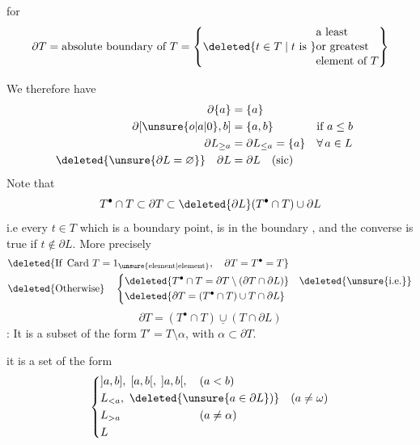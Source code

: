 for
\[
\partial T=\text{absolute boundary of }T
=\left\{\deleted{t\in T\mid t\text{ is }}\begin{aligned}
&\text{a least}\\[-2pt]
&\text{or greatest}\\[-2pt]
&\text{element of }T
\end{aligned}\right\}
\]

We therefore have
\[
\begin{aligned}
\partial\{a\}&=\{a\}\\
\partial[\unsure{o|a|0},b]&=\{a,b\} &&\text{if }a\leq b\\
\partial L_{\geq a}&=\partial L_{\leq a}=\{a\} &&\forall\,a\in L\\
\deleted{\unsure{\partial L=\varnothing}}\quad\partial L&=\partial L\quad\text{(sic)}
\end{aligned}
\]
Note that
\[
T^\bullet\cap T\subset\partial T\subset\deleted{\partial L}(T^\bullet\cap T)\cup\partial L
\]
i.e every $t\in T$ which is a boundary point, is in the boundary , and the converse is true if $t\notin\partial L$. More precisely
\[
\begin{aligned}
&\deleted{\text{If }\operatorname{Card}\,T=1_{\unsure{\mathrm{element}|\mathrm{element}}},\quad\partial T=T^\bullet=T}\\
&\deleted{\text{Otherwise}}\quad
\left\{\begin{aligned}
&\deleted{T^\bullet\cap T=\partial T\setminus(\partial T\cap\partial L)}\quad\deleted{\text{\unsure{i.e.}}}\\
&\deleted{\partial T=(T^\bullet\cap T)\cup T\cap\partial L}
\end{aligned}\right.
\end{aligned}
\]
\[
\boxed{\partial T=(T^\bullet\cap T)\mathbin{\underline{\cup}}(T\cap\partial L)}
\]
 : It is a subset    of the form $T'=T\setminus\alpha$, with $\alpha\subset\partial T$.

 it is a set of the form
\[
\left\{\begin{aligned}
&]a,b],\;[a,b[,\;]a,b[,\quad(a<b)\\
&L_{<a},\ \deleted{\unsure{a\in\partial L})}\quad(a\neq\omega)\\
&L_{>a}\hspace{7em}(a\neq\alpha)\\
&L
\end{aligned}\right.
\]

